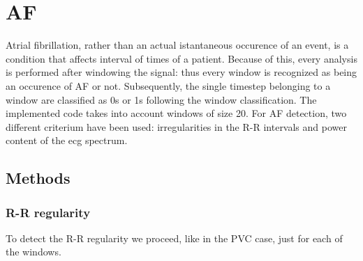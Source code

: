 \documentclass[a4paper,titlepage]{article}
\begin{document}
\begin{figure}[h!]

\hspace*{-\dimexpr\oddsidemargin+1in\relax}\hspace*{-\paperwidth}
\end{figure}

\clearpage


\section{AF}
Atrial fibrillation, rather than an actual istantaneous occurence of an event, is a condition that affects interval of times of a patient.
Because of this, every analysis is performed after windowing the signal: thus every window is recognized as being an occurence of AF or not. Subsequently, the single timestep belonging to a window are classified as 0s or 1s following the window classification.
The implemented code takes into account windows of size 20.
For AF detection, two different criterium have been used: irregularities in the R-R intervals and power content of the ecg spectrum.
\subsection{Methods}
\subsubsection{R-R regularity}
To detect the R-R regularity we proceed, like in the PVC case, just for each of the windows.
\end{document}
